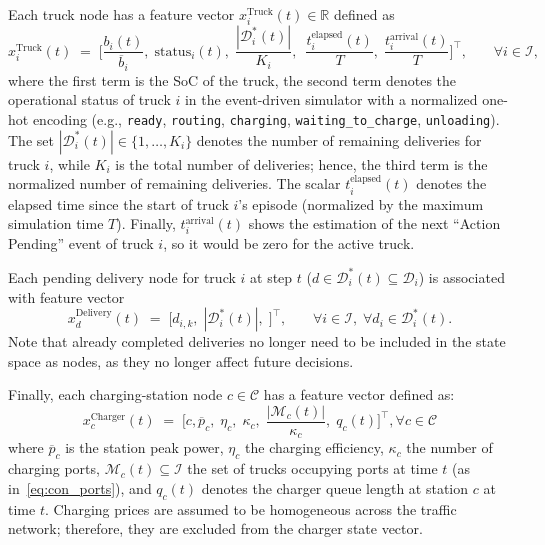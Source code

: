 \documentclass[a4paper,fleqn]{cas-sc}
\begin{document}
Each truck node has a feature vector $x^{\mathrm{Truck}}_i(t)\in\mathbb{R}$ defined as
\begin{equation}
x^{\mathrm{Truck}}_i(t)\;=\;
\Big[
\frac{b_i(t)}{\overline{b}_i},\;
\text{status}_i(t),\;
\frac{|\mathcal{D}^*_i(t)|}{K_i},\;\
\frac{t_i^{\text{elapsed}}(t)}{T},\;
\frac{t_i^{\text{arrival}}(t)}{T}
\Big]^\top,
\;\;\;\quad \forall i \in \mathcal{I},
\label{eq:truck_features}
\end{equation}
where the first term is the SoC of the truck, the second term denotes the operational status of truck $i$ in the event-driven simulator with a normalized one-hot encoding (e.g., \texttt{ready}, \texttt{routing}, \texttt{charging}, \texttt{waiting\_to\_charge}, \texttt{unloading}).
The set $|\mathcal{D}^*_i(t)| \in \{1,\dots, {K_i}\}$ denotes the number of remaining deliveries for truck $i$, while $K_i$ is the total number of deliveries; hence, the third term is the normalized number of remaining deliveries. The scalar $t_i^{\text{elapsed}}(t)$ denotes the elapsed time since the start of truck $i$'s episode (normalized by the maximum simulation time $T$).
Finally, $t_i^{\text{arrival}}(t)$ shows the estimation of the next ``Action Pending'' event of truck $i$, so it would be zero for the active truck. 

Each pending delivery node for truck $i$ at step $t$ ($d\in\mathcal{D}^*_i(t) \subseteq \mathcal{D}_i$) is associated with feature vector
\begin{equation}
x^{\mathrm{Delivery}}_d(t)\;=\;
\Big[
d_{i,k},\;
|\mathcal{D}^{*}_{i}(t)|,\;
\Big]^\top,
\;\;\;\quad \forall i \in \mathcal{I}, \; \forall d_i \in \mathcal{D}_{i}^*(t).
\label{eq:delivery_features}
\end{equation}
Note that already completed deliveries no longer need to be included in the state space as nodes, as they no longer affect future decisions.

Finally, each charging-station node $c\in\mathcal{C}$ has a feature vector defined as:
\begin{equation}
x^{\mathrm{Charger}}_c(t)\;=\;
\Big[
c,
\overline{p}_c,\;
\eta_c,\;
\kappa_c,\;
\frac{|\mathcal{M}_c(t)|}{\kappa_c},\;
q_c(t)
\Big]^\top,
\forall c \in \mathcal{C}
\label{eq:charger_features}
\end{equation}
where $\overline{p}_c$ is the station peak power, $\eta_c$ the charging efficiency, $\kappa_c$ the number of charging ports, $\mathcal{M}_c(t)\subseteq\mathcal{I}$ the set of trucks occupying ports at time $t$ (as in~\eqref{eq:con_ports}), and $q_c(t)$ denotes the charger queue length at station $c$ at time $t$. Charging prices are assumed to be homogeneous across the traffic network; therefore, they are excluded from the charger state vector.
\end{document}
